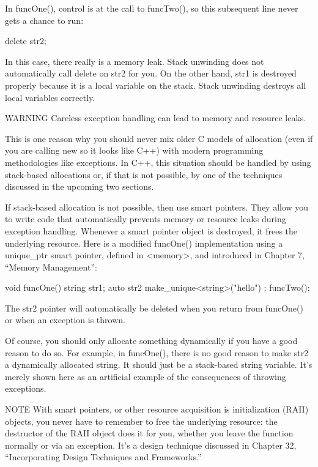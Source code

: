 In funcOne(), control is at the call to funcTwo(), so this subsequent line never gets a chance to run:

\begin{cpp}
delete str2;
\end{cpp}

In this case, there really is a memory leak. Stack unwinding does not automatically call delete on str2 for you. On the other hand, str1 is destroyed properly because it is a local variable on the stack. Stack unwinding destroys all local variables correctly.

\begin{myWarning}{WARNING}
Careless exception handling can lead to memory and resource leaks.
\end{myWarning}

This is one reason why you should never mix older C models of allocation (even if you are calling new so it looks like C++) with modern programming methodologies like exceptions. In C++, this situation should be handled by using stack-based allocations or, if that is not possible, by one of the techniques discussed in the upcoming two sections.


If stack-based allocation is not possible, then use smart pointers. They allow you to write code that automatically prevents memory or resource leaks during exception handling. Whenever a smart pointer object is destroyed, it frees the underlying resource. Here is a modified funcOne() implementation using a unique\_ptr smart pointer, defined in <memory>, and introduced in Chapter 7, “Memory Management”:

\begin{cpp}
void funcOne()
{
    string str1;
    auto str2 { make_unique<string>("hello") };
    funcTwo();
}
\end{cpp}

The str2 pointer will automatically be deleted when you return from funcOne() or when an exception is thrown.

Of course, you should only allocate something dynamically if you have a good reason to do so. For example, in funcOne(), there is no good reason to make str2 a dynamically allocated string. It should just be a stack-based string variable. It’s merely shown here as an artificial example of the consequences of throwing exceptions.

\begin{myNotic}{NOTE}
With smart pointers, or other resource acquisition is initialization (RAII) objects, you never have to remember to free the underlying resource: the destructor of the RAII object does it for you, whether you leave the function normally or via an exception. It’s a design technique discussed in Chapter 32, “Incorporating Design Techniques and Frameworks.”
\end{myNotic}

